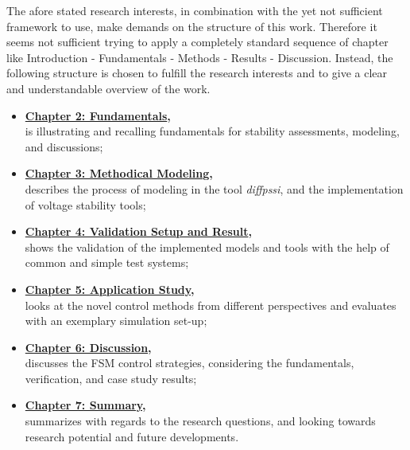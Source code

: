 The afore stated research interests, in combination with the yet not sufficient framework to use, make demands on the structure of this work. 
Therefore it seems not sufficient trying to apply a completely standard sequence of chapter like \glqq Introduction - Fundamentals - Methods - Results - Discussion\grqq.
Instead, the following structure is chosen to fulfill the research interests and to give a clear and understandable overview of the work.
\begin{itemize}
    \item \textbf{\hyperref[chap:fundamentals]{Chapter 2: Fundamentals},}\\
    is illustrating and recalling fundamentals for stability assessments, modeling, and discussions;
    \item \textbf{\hyperref[chap:methodical-modeling]{Chapter 3: Methodical Modeling},}\\
    describes the process of modeling in the tool \textit{diffpssi}, and the implementation of voltage stability tools;
    \item \textbf{\hyperref[chap:verification]{Chapter 4: Validation Setup and Result},}\\
    shows the validation of the implemented models and tools with the help of common and simple test systems;
    \item \textbf{\hyperref[chap:case-study]{Chapter 5: Application Study},}\\
    looks at the novel control methods from different perspectives and evaluates with an exemplary simulation set-up; 
    \item \textbf{\hyperref[chap:discussion]{Chapter 6: Discussion},}\\
    discusses the FSM control strategies, considering the fundamentals, verification, and case study results;
    \item \textbf{\hyperref[chap:summary]{Chapter 7: Summary},}\\
    summarizes with regards to the research questions, and looking towards research potential and future developments. 
\end{itemize}


